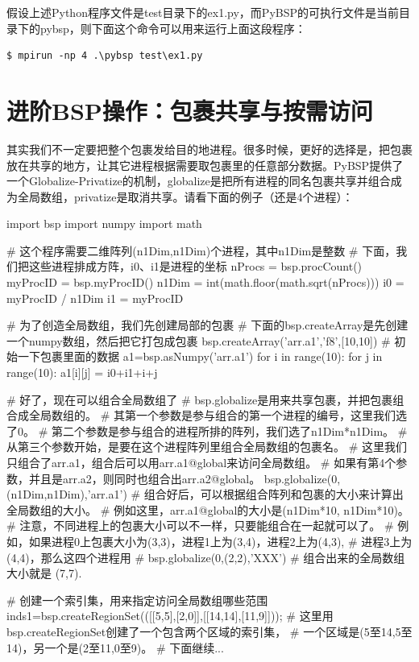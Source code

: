 \documentclass{article}
\begin{document}
假设上述Python程序文件是test目录下的ex1.py，而PyBSP的可执行文件是当前目录下的pybsp，则下面这个命令可以用来运行上面这段程序：
\begin{verbatim}
$ mpirun -np 4 .\pybsp test\ex1.py
\end{verbatim}


\section{进阶BSP操作：包裹共享与按需访问}
其实我们不一定要把整个包裹发给目的地进程。很多时候，更好的选择是，把包裹放在共享的地方，让其它进程根据需要取包裹里的任意部分数据。PyBSP提供了一个Globalize-Privatize的机制，globalize是把所有进程的同名包裹共享并组合成为全局数组，privatize是取消共享。请看下面的例子（还是4个进程）：
\begin{python}
import bsp
import numpy
import math

# 这个程序需要二维阵列(n1Dim,n1Dim)个进程，其中n1Dim是整数
# 下面，我们把这些进程排成方阵，i0、i1是进程的坐标
nProcs = bsp.procCount()
myProcID = bsp.myProcID()
n1Dim = int(math.floor(math.sqrt(nProcs)))
i0 = myProcID / n1Dim
i1 = myProcID %

# 为了创造全局数组，我们先创建局部的包裹
# 下面的bsp.createArray是先创建一个numpy数组，然后把它打包成包裹
bsp.createArray('arr.a1','f8',[10,10])
# 初始一下包裹里面的数据
a1=bsp.asNumpy('arr.a1')
for i in range(10):
    for j in range(10):
        a1[i][j] = i0+i1+i+j

# 好了，现在可以组合全局数组了
# bsp.globalize是用来共享包裹，并把包裹组合成全局数组的。
# 其第一个参数是参与组合的第一个进程的编号，这里我们选了0。
# 第二个参数是参与组合的进程所排的阵列，我们选了n1Dim*n1Dim。
# 从第三个参数开始，是要在这个进程阵列里组合全局数组的包裹名。
# 这里我们只组合了arr.a1，组合后可以用arr.a1@global来访问全局数组。
# 如果有第4个参数，并且是arr.a2，则同时也组合出arr.a2@global。
bsp.globalize(0,(n1Dim,n1Dim),'arr.a1')
# 组合好后，可以根据组合阵列和包裹的大小来计算出全局数组的大小。
# 例如这里，arr.a1@global的大小是(n1Dim*10, n1Dim*10)。
# 注意，不同进程上的包裹大小可以不一样，只要能组合在一起就可以了。
# 例如，如果进程0上包裹大小为(3,3)，进程1上为(3,4)，进程2上为(4,3),
# 进程3上为(4,4)，那么这四个进程用
# bsp.globalize(0,(2,2),'XXX')
# 组合出来的全局数组大小就是 (7,7).

# 创建一个索引集，用来指定访问全局数组哪些范围
inds1=bsp.createRegionSet(([[5,5],[2,0]],[[14,14],[11,9]]));
# 这里用bsp.createRegionSet创建了一个包含两个区域的索引集，
# 一个区域是(5至14,5至14)，另一个是(2至11,0至9)。
# 下面继续...
\end{python}
\end{document}
